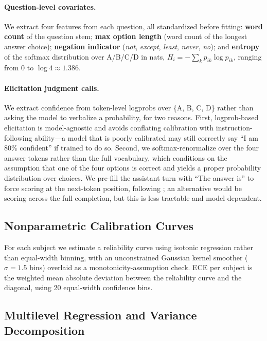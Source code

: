 \documentclass[11pt]{article}
\begin{document}
\paragraph{Question-level covariates.}
We extract four features from each question, all standardized before fitting:
\textbf{word count} of the question stem; \textbf{max option length} (word count
of the longest answer choice); \textbf{negation indicator} (\textit{not},
\textit{except}, \textit{least}, \textit{never}, \textit{no}); and
\textbf{entropy} of the softmax distribution over A/B/C/D in nats,
$H_i = -\sum_k p_{ik} \log p_{ik}$, ranging from $0$ to $\log 4 \approx 1.386$.

\paragraph{Elicitation judgment calls.}
We extract confidence from token-level logprobs over \{A, B, C, D\} rather than
asking the model to verbalize a probability, for two reasons. First, logprob-based
elicitation is model-agnostic and avoids conflating calibration with
instruction-following ability---a model that is poorly calibrated may still
correctly say ``I am 80\% confident'' if trained to do so. Second, we
softmax-renormalize over the four answer tokens rather than the full vocabulary,
which conditions on the assumption that one of the four options is correct and
yields a proper probability distribution over choices. We pre-fill the assistant
turn with ``The answer is'' to force scoring at the next-token position,
following \citet{kadavath2022language}; an alternative would be scoring across
the full completion, but this is less tractable and model-dependent.

\subsection{Nonparametric Calibration Curves}

For each subject we estimate a reliability curve using isotonic regression
\citep{zadrozny2002transforming} rather than equal-width binning, with an
unconstrained Gaussian kernel smoother ($\sigma = 1.5$ bins) overlaid as a
monotonicity-assumption check. ECE per subject is the weighted mean absolute
deviation between the reliability curve and the diagonal, using 20 equal-width
confidence bins.

\subsection{Multilevel Regression and Variance Decomposition}
\end{document}
